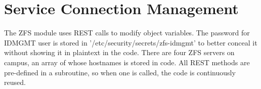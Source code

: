 \section{Service Connection Management}

The ZFS module uses REST calls to modify object variables. The password for IDMGMT user is stored in '/etc/security/secrets/zfs-idmgmt' to better conceal it without showing it in plaintext in the code. There are four ZFS servers on campus, an array of whose hostnames is stored in code. All REST methods are pre-defined in a subroutine, so when one is called, the code is continuously reused. 
